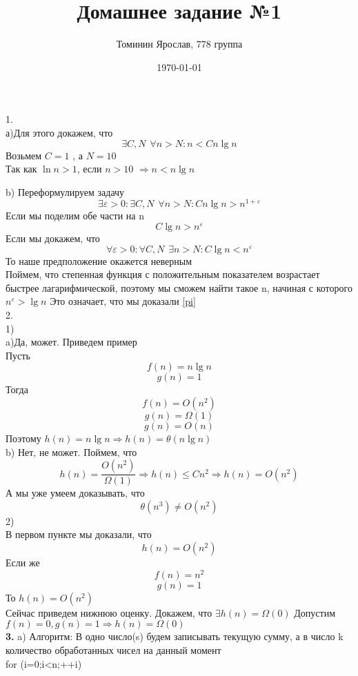 \documentclass[a4paper,12pt]{article}
\author{Томинин Ярослав, 778 группа}
\title{Домашнее задание №1}
\date{\today}
\begin{document}
 

\maketitle
\newpage


1.\\ 
а)Для этого докажем, что
\[\exists C,N  \hspace{5pt} \forall n>N : n<Cn\lg n \]
Возьмем $C=1$ , а $N=10$ \\
Так как $\ln n>1$, если $n>10$ $\Rightarrow n < n \lg n $ 


b)
Переформулируем задачу 
\[\exists \varepsilon > 0 : \exists C,N  \hspace{5pt} \forall n>N : Cn\lg n > n^{1+\varepsilon}\]
Если мы поделим обе части на n
\[C\lg n > n^\varepsilon\]
Если мы докажем, что
\begin{equation}\label{pi}
\forall \varepsilon > 0: \forall C,N  \hspace{5pt} \exists n>N : C\lg n < n^\varepsilon
\end{equation}
То наше предположение окажется неверным\\
Поймем, что степенная функция с положительным показателем возрастает быстрее лагарифмической, поэтому мы сможем найти такое  n, начиная с которого $n^\varepsilon > \lg n$
Это означает, что мы доказали \eqref{pi}\\
2.\\
1)\\a)Да, может. Приведем пример\\
Пусть \[f(n) = n \lg n\] 
\[g(n) = 1\] 
Тогда \[f(n) = O(n^2)\]
\[g(n) = \Omega(1)\]
\[g(n) = O(n)\]
Поэтому $h(n)=n \lg n\Rightarrow h(n)=\theta(n \lg n)$\\
b)
Нет, не может.
Поймем, что 
\[h(n)=\frac{O(n^2)}{\Omega(1)}\Rightarrow h(n)\leq Cn^2\Rightarrow h(n)=O(n^2)\]
А мы уже умеем доказывать, что
\[\theta (n^3)\neq O(n^2)\]
2)\\
В первом пункте мы доказали, что
\[h(n)=O(n^2)\]
Если же 
\[f(n)=n^2\]
\[g(n)=1\]
То $h(n)=O(n^2)$\\
Сейчас приведем нижнюю оценку. Докажем, что $\exists h(n)=\Omega(0)$
Допустим $f(n)=0 , g(n)=1 \Rightarrow h(n)=\Omega(0)$\\
\textbf{3.}
a)
Алгоритм:
В одно число(s) будем записывать текущую сумму, а в число k количество обработанных чисел на данный момент\\
for (i=0;i<n;++i)\\
\end{document}
